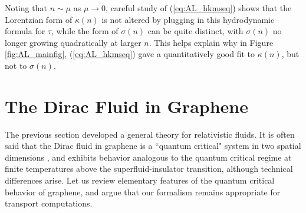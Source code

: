 Noting that $n\sim \mu$ as $\mu\rightarrow 0$,  careful study of (\ref{eq:AL_hkmseq}) shows that the Lorentzian form of $\kappa(n)$ is not altered by plugging in this hydrodynamic formula for $\tau$,   while the form of $\sigma(n)$ can be quite distinct,  with $\sigma(n)$ no longer growing quadratically at larger $n$.   This helps explain why in Figure \ref{fig:AL_mainfig}, (\ref{eq:AL_hkmseq}) gave a quantitatively good fit to $\kappa(n)$, but not to $\sigma(n)$. 
 
 \section{The Dirac Fluid in Graphene}\label{section:AL_secgraphene}
 The previous section developed a general theory for relativistic fluids.    It is often said that the Dirac fluid in graphene is a ``quantum critical" system in two spatial dimensions \cite{vafek_anomalous_2007, sheehy_quantum_2007, muller_graphene:_2009}, and exhibits behavior analogous to the quantum critical regime at finite temperatures above the superfluid-insulator transition, although technical differences arise.  Let us review elementary features of the quantum critical behavior of graphene, and argue that our formalism remains appropriate for transport computations.

